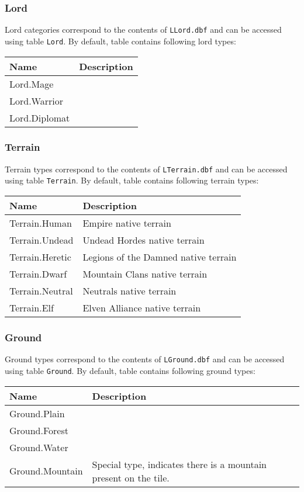 \subsubsection{Lord}
\label{LordCategory}
Lord categories correspond to the contents of \texttt{LLord.dbf} and can be accessed using table \texttt{Lord}.
By default, table contains following lord types:\\
\begin{tabularx}{\linewidth}{| l | X |}
\hline
\textbf{Name} & \textbf{Description} \\
\hline
Lord.Mage &\\
\hline
Lord.Warrior &\\
\hline
Lord.Diplomat &\\
\hline
\end{tabularx}

\subsubsection{Terrain}
\label{TerrainCategory}
Terrain types correspond to the contents of \texttt{LTerrain.dbf} and can be accessed using table \texttt{Terrain}.
By default, table contains following terrain types:\\
\begin{tabularx}{\linewidth}{| l | X |}
\hline
\textbf{Name} & \textbf{Description} \\
\hline
Terrain.Human & Empire native terrain\\
\hline
Terrain.Undead & Undead Hordes native terrain\\
\hline
Terrain.Heretic & Legions of the Damned native terrain\\
\hline
Terrain.Dwarf & Mountain Clans native terrain\\
\hline
Terrain.Neutral & Neutrals native terrain\\
\hline
Terrain.Elf & Elven Alliance native terrain\\
\hline
\end{tabularx}

\subsubsection{Ground}
\label{GroundCategory}
Ground types correspond to the contents of \texttt{LGround.dbf} and can be accessed using table \texttt{Ground}.
By default, table contains following ground types:\\
\begin{tabularx}{\linewidth}{| l | X |}
\hline
\textbf{Name} & \textbf{Description} \\
\hline
Ground.Plain &\\
\hline
Ground.Forest &\\
\hline
Ground.Water &\\
\hline
Ground.Mountain & Special type, indicates there is a mountain present on the tile.\\
\hline
\end{tabularx}


